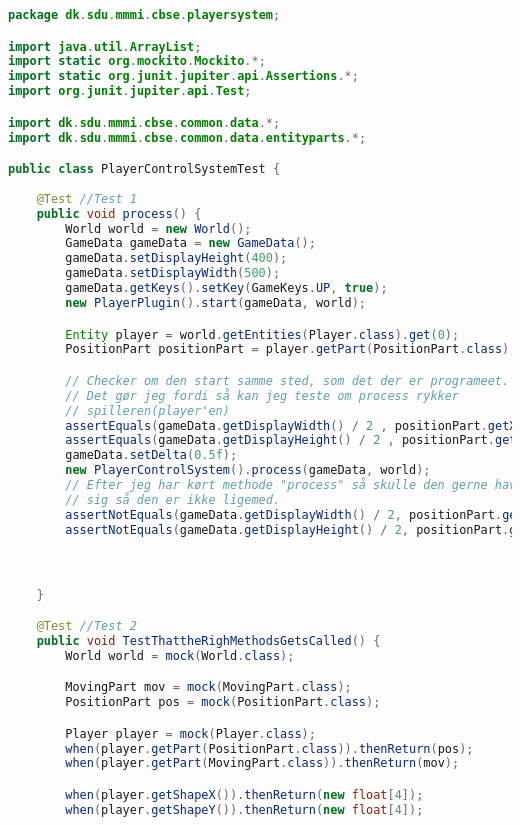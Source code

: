 \begin{lstlisting}[caption={dk.sdu.mmmi.cbse.playersystem.PlayerControlSystemTest.java}, label={lst:PlayerControlSystemTest.java}, language=java, firstnumber=1]
package dk.sdu.mmmi.cbse.playersystem;

import java.util.ArrayList;
import static org.mockito.Mockito.*;
import static org.junit.jupiter.api.Assertions.*;
import org.junit.jupiter.api.Test;

import dk.sdu.mmmi.cbse.common.data.*;
import dk.sdu.mmmi.cbse.common.data.entityparts.*;

public class PlayerControlSystemTest {
    
    @Test //Test 1
    public void process() {
        World world = new World();
        GameData gameData = new GameData();
        gameData.setDisplayHeight(400);
        gameData.setDisplayWidth(500);
        gameData.getKeys().setKey(GameKeys.UP, true);
        new PlayerPlugin().start(gameData, world);

        Entity player = world.getEntities(Player.class).get(0);
        PositionPart positionPart = player.getPart(PositionPart.class);

        // Checker om den start samme sted, som det der er programeet.
        // Det gør jeg fordi så kan jeg teste om process rykker
        // spilleren(player'en)
        assertEquals(gameData.getDisplayWidth() / 2 , positionPart.getX());
        assertEquals(gameData.getDisplayHeight() / 2 , positionPart.getY());
        gameData.setDelta(0.5f);
        new PlayerControlSystem().process(gameData, world);
        // Efter jeg har kørt methode "process" så skulle den gerne have rykket
        // sig så den er ikke ligemed.
        assertNotEquals(gameData.getDisplayWidth() / 2, positionPart.getX());
        assertNotEquals(gameData.getDisplayHeight() / 2, positionPart.getY());



    }

    @Test //Test 2
    public void TestThattheRighMethodsGetsCalled() {
        World world = mock(World.class);

        MovingPart mov = mock(MovingPart.class);
        PositionPart pos = mock(PositionPart.class);

        Player player = mock(Player.class);
        when(player.getPart(PositionPart.class)).thenReturn(pos);
        when(player.getPart(MovingPart.class)).thenReturn(mov);

        when(player.getShapeX()).thenReturn(new float[4]);
        when(player.getShapeY()).thenReturn(new float[4]);


\end{lstlisting}
